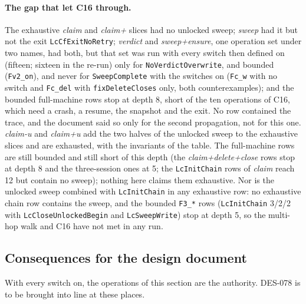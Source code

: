 \documentclass[a4paper,10pt,fleqn]{article}
\newcommand{\field}[1]{\texttt{#1}}
\begin{document}
\paragraph{The gap that let C16 through.} The exhaustive \emph{claim} and
\emph{claim+} slices had no unlocked sweep; \emph{sweep} had it but not the
exit \field{LcCfExitNoRetry}; \emph{verdict} and \emph{sweep+ensure}, one
operation set under two names, had both, but that set was run with every
switch then defined on (fifteen; sixteen in the re-run) only for \field{NoVerdictOverwrite}, and bounded
(\texttt{Fv2\_on}), and never for \field{SweepComplete} with the switches on
(\texttt{Fc\_w} with no switch and \texttt{Fc\_del} with
\field{fixDeleteCloses} only, both counterexamples); and the bounded full-machine rows stop at depth 8, short of
the ten operations of C16, which need a crash, a resume, the snapshot and the
exit. No row contained the trace, and the document said so only for the
second propagation, not for this one. \emph{claim-u} and \emph{claim+u} add
the two halves of the unlocked sweep to the exhaustive slices and are
exhausted, with the invariants of the table. The full-machine rows are still
bounded and still short of this depth (the \emph{claim+delete+close} rows stop
at depth 8 and the three-session ones at 5; the \field{LcInitChain} rows of
\emph{claim} reach 12 but contain no sweep); nothing here claims them exhaustive. Nor is the
unlocked sweep combined with \field{LcInitChain} in any exhaustive row: no
exhaustive chain row contains the sweep, and the bounded \texttt{F3\_*} rows
(\field{LcInitChain} 3/2/2 with \field{LcCloseUnlockedBegin} and
\field{LcSweepWrite}) stop at depth 5, so the multi-hop walk and C16 have not
met in any run.


\subsection{Consequences for the design document}
\label{sec:lc-consequences}

With every switch on, the operations of this section are the authority.
DES-078 is to be brought into line at these places.
\end{document}
